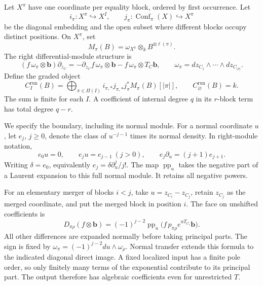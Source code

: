 Let \(X^\pi\) have one coordinate per equality block,
ordered by first occurrence. Let
\[
 i_\pi:X^\pi\hookrightarrow X^I,\qquad
 j_\pi:\operatorname{Conf}_\pi(X)\hookrightarrow X^\pi
\]
be the diagonal embedding and the open subset where different
blocks occupy distinct positions. On \(X^\pi\), set
\[
 M_\pi(B)=\omega_{X^\pi}\otimes_k B^{\otimes\ell(\pi)}.
\]
The right differential-module structure is
\begin{equation}\label{v4-eq:regular-run-connection}
 (f\,\omega_\pi\otimes\mathbf b)\partial_{z_C}
       =-\partial_{z_C}f\,\omega_\pi\otimes\mathbf b
        -f\,\omega_\pi\otimes T_C\mathbf b,
 \qquad
 \omega_\pi=dz_{C_1}\wedge\cdots\wedge dz_{C_{|\pi|}}.
\end{equation}
Define the graded object
\begin{equation}\label{v4-eq:regular-run-complex}
 C_I^{\mathrm{run}}(B)
    =\bigoplus_{\pi\in\Pi(I)}
       i_{\pi,*}j_{\pi,*}j_\pi^*M_\pi(B)[|\pi|],
 \qquad C_\varnothing^{\mathrm{run}}(B)=k.
\end{equation}
The sum is finite for each \(I\). A coefficient of internal
degree \(q\) in its \(r\)-block term has total degree \(q-r\).

We specify the boundary, including its normal module.
For a normal coordinate \(u\), let \(e_j\), \(j\geq0\),
denote the class of \(u^{-j-1}\) times its normal density.
In right-module notation,
\[
 e_0u=0,\qquad e_ju=e_{j-1}\ (j>0),\qquad
 e_j\partial_u=(j+1)e_{j+1}.
\]
Writing \(\delta=e_0\), equivalently
\(e_j=\delta\partial_u^j/j!\).
The map \(\operatorname{pp}_u\) takes the negative part
of a Laurent expansion to this full normal module. It retains
all negative powers.

For an elementary merger of blocks \(i<j\), take
\(u=z_{C_i}-z_{C_j}\), retain \(z_{C_j}\) as the merged
coordinate, and put the merged block in position \(i\).
The face on unshifted coefficients is
\begin{equation}\label{v4-eq:regular-run-face}
 D_{\pi\rho}(f\otimes\mathbf b)
       =(-1)^{j-2}\operatorname{pp}_u
          \bigl(f\,p_{\pi\rho}e^{uT_{C_i}}\mathbf b\bigr).
\end{equation}
All other differences are expanded normally before taking
principal parts. The sign is fixed by
\(\omega_\pi=(-1)^{j-2}du\wedge\omega_\rho\).
Normal transfer extends this formula to the indicated
diagonal direct image. A fixed localized input has a finite
pole order, so only finitely many terms of the exponential
contribute to its principal part. The output therefore has
algebraic coefficients even for unrestricted \(T\).

